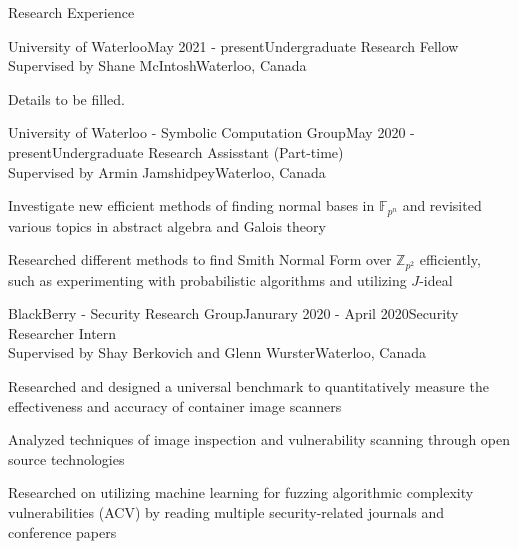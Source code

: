 \documentclass{cv}
\begin{document}
\begin{rSection}{Research Experience}
\begin{rSubsection}{University of Waterloo}{May 2021 - present}{Undergraduate Research Fellow \\ Supervised by Shane McIntosh}{Waterloo, Canada}
	\item Details to be filled.
\end{rSubsection}

\begin{rSubsection}{University of Waterloo - Symbolic Computation Group}{May 2020 - present}{Undergraduate Research Assisstant (Part-time)\\ Supervised by Armin Jamshidpey}{Waterloo, Canada}
  	\item Investigate new efficient methods of finding normal bases in $\mathbb{F}_{p^n}$ and revisited various topics in abstract algebra and Galois theory
  	\item Researched different methods to find Smith Normal Form over $\mathbb{Z}_{p^2}$ efficiently, such as experimenting with probabilistic algorithms and utilizing $J$-ideal
\end{rSubsection}

\begin{rSubsection}{BlackBerry - Security Research Group}{Janurary 2020 - April 2020}{Security Researcher Intern \\ Supervised by Shay Berkovich and Glenn Wurster}{Waterloo, Canada}
	\item Researched and designed a universal benchmark to quantitatively measure the effectiveness and accuracy of container image scanners
	\item Analyzed techniques of image inspection and vulnerability scanning through open source technologies
	\item Researched on utilizing machine learning for fuzzing algorithmic complexity vulnerabilities (ACV) by reading multiple security-related journals and conference papers
\end{rSubsection}
\end{rSection}
\end{document}
